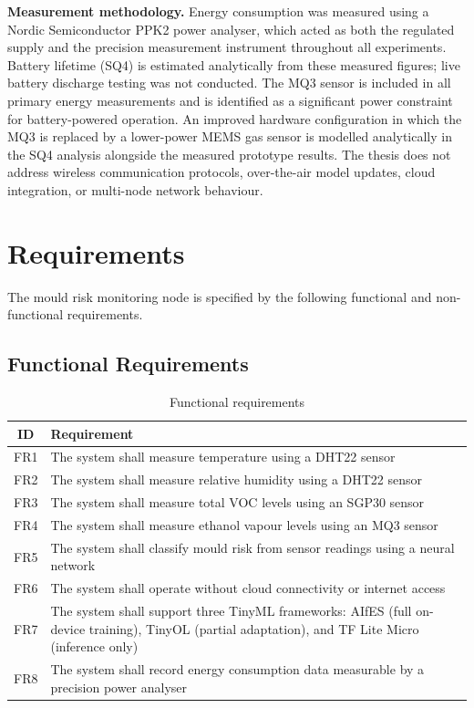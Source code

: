 \textbf{Measurement methodology.} Energy consumption was measured using a Nordic Semiconductor PPK2 power analyser, which acted as both the regulated supply and the precision measurement instrument throughout all experiments. Battery lifetime (SQ4) is estimated analytically from these measured figures; live battery discharge testing was not conducted. The MQ3 sensor is included in all primary energy measurements and is identified as a significant power constraint for battery-powered operation. An improved hardware configuration in which the MQ3 is replaced by a lower-power MEMS gas sensor is modelled analytically in the SQ4 analysis alongside the measured prototype results. The thesis does not address wireless communication protocols, over-the-air model updates, cloud integration, or multi-node network behaviour.

\section{Requirements}

The mould risk monitoring node is specified by the following functional and non-functional requirements.

\subsection{Functional Requirements}

\begin{table}[H]
\centering
\caption{Functional requirements}
\label{tab:fr}
\begin{tabulary}{\textwidth}{|c|L|}
\hline
\textbf{ID} & \textbf{Requirement} \\
\hline
FR1 & The system shall measure temperature using a DHT22 sensor \\
\hline
FR2 & The system shall measure relative humidity using a DHT22 sensor \\
\hline
FR3 & The system shall measure total VOC levels using an SGP30 sensor \\
\hline
FR4 & The system shall measure ethanol vapour levels using an MQ3 sensor \\
\hline
FR5 & The system shall classify mould risk from sensor readings using a neural network \\
\hline
FR6 & The system shall operate without cloud connectivity or internet access \\
\hline
FR7 & The system shall support three TinyML frameworks: AIfES (full on-device training), TinyOL (partial adaptation), and TF Lite Micro (inference only) \\
\hline
FR8 & The system shall record energy consumption data measurable by a precision power analyser \\
\hline
\end{tabulary}
\end{table}

